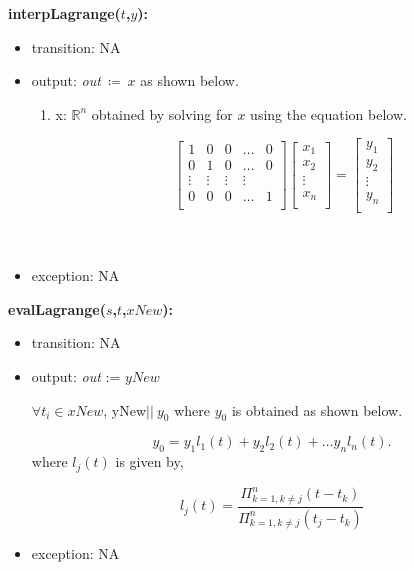 \documentclass[12pt, titlepage]{article}
\begin{document}

\noindent \textbf{interpLagrange($t$,$y$):}
\begin{itemize}
	\item transition: NA
		
	\item output: \textit{out}$\ \coloneqq\ x$ as shown below.
 
		\begin{enumerate}
		
			\item x: $\mathbb{R}^{n}$ obtained by solving for $x$ 
			using the equation below.
			
			\begin{equation*}
			\begin{bmatrix}
			1 & 0 & 0 & \dots & 0 \\
			0 & 1 & 0 & \dots & 0 \\
			\vdots & \vdots & \vdots & \vdots \\
			0 & 0 & 0 & \dots & 1 \\
			\end{bmatrix}
			\begin{bmatrix}
			x_1  \\
			x_2 \\
			\vdots \\
			x_n \\
			\end{bmatrix} = 
			\begin{bmatrix}
			y_1  \\
			y_2 \\
			\vdots \\
			y_n \\
			\end{bmatrix}
			\end{equation*}\\ \\ 
		\end{enumerate}
		
	\item exception: NA
\end{itemize}

\noindent \textbf{evalLagrange($s$,$t$,$xNew$):}
\begin{itemize}
	\item transition: NA
	
	\item output:  \textit{out} := $yNew$
	
	$\forall t_i \in xNew$, yNew$\vert\vert\ y_0$ where $y_0$ is obtained as 
	shown 
	below.
	
	\begin{equation*}
	y_0 = y_1 l_1 (t) + y_2 l_2(t) + \dots y_n l_n (t).
	\end{equation*}
	where $l_j (t)$ is given by,
	
	
	\begin{equation*}
	l_j (t) =  \frac{ \Pi _{k=1, k\neq j} ^n (t - t_k)} {\Pi _{k=1,k \neq j} ^n 
		(t_j - t_k)}
	\end{equation*}
	\item exception: NA
\end{itemize}
\end{document}
